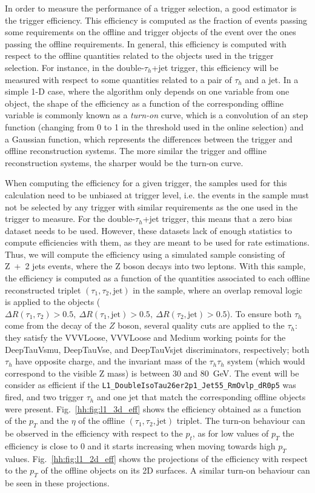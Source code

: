 \documentclass[../main.tex]{subfiles}
\begin{document}
In order to measure the performance of a trigger selection, a good estimator is the trigger efficiency. This efficiency is computed as the fraction of events passing some requirements on the offline and trigger objects of the event over the ones passing the offline requirements. In general, this efficiency is computed with respect to the offline quantities related to the objects used in the trigger selection. For instance, in the double-$\tau_h$+jet trigger, this efficiency will be measured with respect to some quantities related to a pair of $\tau_h$ and a jet. In a simple 1-D case, where the algorithm only depends on one variable from one object, the shape of the efficiency as a function of the corresponding offline variable is commonly known as a \textit{turn-on} curve, which is a convolution of an step function (changing from 0 to 1 in the threshold used in the online selection) and a Gaussian function, which represents the differences between the trigger and offline reconstruction systems. The more similar the trigger and offline reconstruction systems, the sharper would be the turn-on curve.

When computing the efficiency for a given trigger, the samples used for this calculation need to be unbiased at trigger level, i.e. the events in the sample must not be selected by any trigger with similar requirements as the one used in the trigger to measure. For the double-$\tau_h$+jet trigger, this means that a zero bias dataset needs to be used. However, these datasets lack of enough statistics to compute efficiencies with them, as they are meant to be used for rate estimations. Thus, we will compute the efficiency using a simulated sample consisting of Z~+~2 jets events, where the Z boson decays into two leptons. With this sample, the efficiency is computed as a function of the quantities associated to each offline reconstructed triplet $(\tau_1, \tau_2, \text{jet})$ in the sample, where an overlap removal logic is applied to the objects ($\Delta R(\tau_1,\tau_2)>0.5,~\Delta R(\tau_1,\text{jet})>0.5,~\Delta R(\tau_2,\text{jet}) > 0.5$). To ensure both $\tau_h$ come from the decay of the $Z$ boson, several quality cuts are applied to the $\tau_h$: they satisfy the VVVLoose, VVVLoose and Medium working points for the DeepTauVsmu, DeepTauVse, and DeepTauVsjet discriminators, respectively; both $\tau_h$ have opposite charge, and the invariant mass of the $\tau_h\tau_h$ system (which would correspond to the visible Z mass) is between 30 and 80~GeV. The event will be consider as efficient if the \texttt{L1\_DoubleIsoTau26er2p1\_Jet55\_RmOvlp\_dR0p5} was fired, and two trigger $\tau_h$ and one jet that match the corresponding offline objects were present. Fig.~\ref{hh:fig:l1_3d_eff} shows the efficiency obtained as a function of the $p_T$ and the $\eta$ of the offline $(\tau_1, \tau_2, \text{jet})$ triplet. The turn-on behaviour can be observed in the efficiency with respect to the $p_t$, as for low values of $p_T$ the efficiency is close to 0 and it starts increasing when moving towards high $p_T$ values. Fig.~\ref{hh:fig:l1_2d_eff} shows the projections of the efficiency with respect to the $p_T$ of the offline objects on its 2D surfaces. A similar turn-on behaviour can be seen in these projections.
\end{document}
